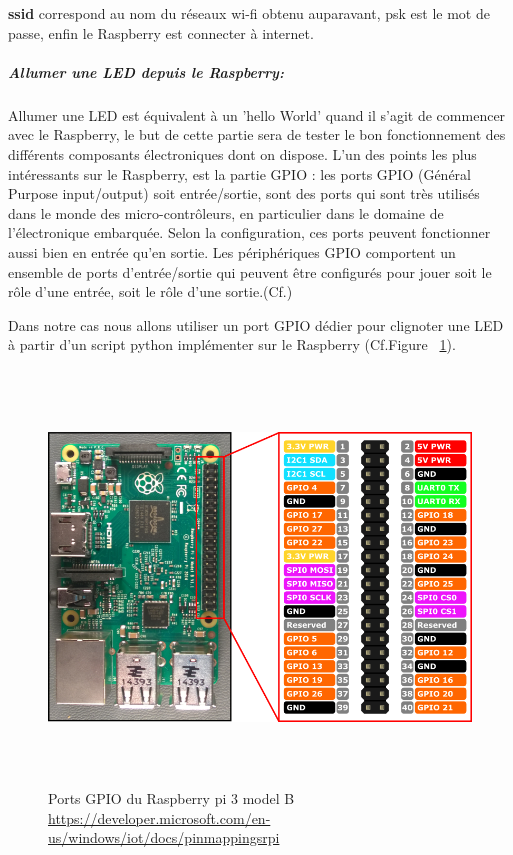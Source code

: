 \documentclass[12pt,a4paper]{article}
\begin{document}
\textbf{ssid} correspond au nom du réseaux wi-fi obtenu auparavant, psk est le mot de passe, enfin le Raspberry est connecter à internet.\par

\subparagraph{Allumer une LED depuis le Raspberry:} Allumer une LED est équivalent à un 'hello World' quand il s'agit de commencer avec le Raspberry, le but de cette partie sera de tester le bon fonctionnement des différents composants électroniques dont on dispose.
L’un des points les plus intéressants sur le Raspberry, est la partie GPIO : les ports GPIO (Général Purpose input/output) soit entrée/sortie, sont des ports qui sont très utilisés dans le monde des micro-contrôleurs, en particulier dans le domaine de l’électronique embarquée. Selon la configuration, ces ports peuvent fonctionner aussi bien en entrée qu’en sortie.
Les périphériques GPIO comportent un ensemble de ports d’entrée/sortie qui peuvent être configurés pour jouer soit le rôle d’une entrée, soit le rôle d'une sortie.(Cf.\cite{Ref18})
\par
Dans notre cas nous allons utiliser un port GPIO dédier pour clignoter une LED à partir d'un script python implémenter sur le Raspberry (Cf.Figure ~\ref{GPIO}).

\begin{figure}[ht]
\centering
	  \includegraphics[width = 15cm,height=11cm]{pinout.png}
     \caption{Ports GPIO du Raspberry pi 3 model B 
     \href{url}{https://developer.microsoft.com/en-us/windows/iot/docs/pinmappingsrpi}  }
	\label{GPIO}
\end{figure}
\end{document}
